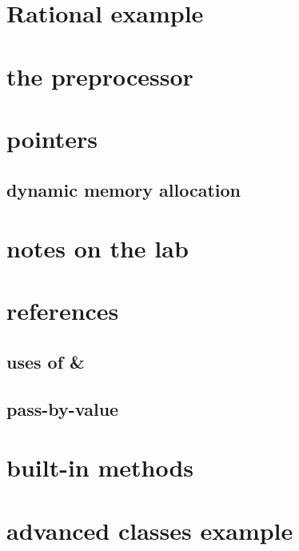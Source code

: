 \section{Rational example}




\section{the preprocessor}



\section{pointers}



\subsection{dynamic memory allocation}



\section{notes on the lab}




\section{references}



\subsection{uses of \&}



\subsection{pass-by-value}



\section{built-in methods}



\section{advanced classes example}


